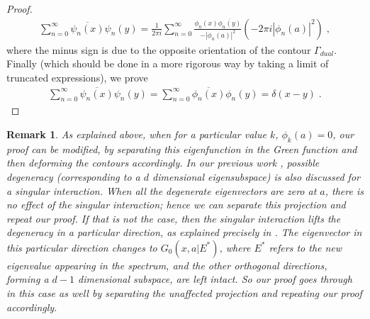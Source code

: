 \documentclass[amsmath,amssymb,14pt]{article}
\numberwithin{equation}{section}
\newtheorem{myremark}[mytheo]{Remark}
\begin{document}
\begin{proof}
\begin{eqnarray}
   \sum_{n=0}^{\infty} \overline{\psi_n(x)} \psi_n (y) =   \frac{1}{2\pi i} \sum_{n=0}^{\infty} \frac{\phi_n(x) \overline{\phi_n(y)}}{-|\phi_n(a)|^2} \left( -2\pi i |\phi_n(a)|^2 \right) \;,
\end{eqnarray}
%
where the minus sign is due to the opposite orientation of the contour $\Gamma_{dual}$. Finally (which should be done in a more rigorous way by  taking a limit of truncated expressions), we prove
%
\begin{eqnarray}
   \sum_{n=0}^{\infty} \overline{\psi_n(x)} \psi_n (y) =      \sum_{n=0}^{\infty} \overline{\phi_n(x)} \phi_n (y) = \delta(x-y) \;. 
\end{eqnarray}
%
\end{proof}

\begin{myremark} As explained above, when for a particular value $k$, $\phi_k(a)=0$, our proof can be modified, by separating this eigenfunction in the Green function and then deforming the contours accordingly. In our previous work \cite{Annals23},  possible degeneracy (corresponding to a $d$ dimensional eigensubspace) is also discussed for a singular interaction. When all the degenerate eigenvectors are zero at $a$, there is no effect of the singular interaction; hence we can separate this projection and repeat our proof.  If that is not the case, then the singular interaction lifts the degeneracy in a particular direction, as explained precisely in \cite{Annals23}. The eigenvector in this particular direction changes to $G_0(x,a|E^*)$, where $E^*$ refers to the new eigenvalue appearing in the spectrum,  and the other orthogonal directions, forming a $d-1$ dimensional subspace, are left intact.  So our proof goes through in this case as well by separating the unaffected projection and repeating our proof accordingly.  \end{myremark}
\end{document}
